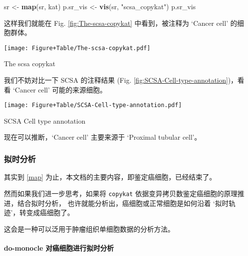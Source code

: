 \documentclass[
]{article}
\newenvironment{Shaded}{\begin{snugshade}}{\end{snugshade}}
\newcommand{\KeywordTok}[1]{\textcolor[rgb]{0.13,0.29,0.53}{\textbf{#1}}}
\newcommand{\NormalTok}[1]{#1}
\newcommand{\StringTok}[1]{\textcolor[rgb]{0.31,0.60,0.02}{#1}}
\begin{document}
\begin{Shaded}
\begin{Highlighting}[]
\NormalTok{sr \textless{}{-}}\StringTok{ }\KeywordTok{map}\NormalTok{(sr, kat)}
\NormalTok{p.sr\_vis \textless{}{-}}\StringTok{ }\KeywordTok{vis}\NormalTok{(sr, }\StringTok{"scsa\_copykat"}\NormalTok{)}
\NormalTok{p.sr\_vis}
\end{Highlighting}
\end{Shaded}

这样我们就能在 Fig. \ref{fig:The-scsa-copykat} 中看到，被注释为 `Cancer cell' 的细胞群体。

\def\@captype{figure}
\begin{center}
\texttt{[image: Figure+Table/The-scsa-copykat.pdf]}
\caption{The scsa copykat}\label{fig:The-scsa-copykat}
\end{center}

我们不妨对比一下 SCSA 的注释结果 (Fig. \ref{fig:SCSA-Cell-type-annotation})，看看 `Cancer cell' 可能的来源细胞。

\def\@captype{figure}
\begin{center}
\texttt{[image: Figure+Table/SCSA-Cell-type-annotation.pdf]}
\caption{SCSA Cell type annotation}\label{fig:SCSA-Cell-type-annotation}
\end{center}

现在可以推断，`Cancer cell' 主要来源于 `Proximal tubular cell'。

\hypertarget{ux62dfux65f6ux5206ux6790}{%
\subsubsection{拟时分析}\label{ux62dfux65f6ux5206ux6790}}

其实到 \ref{map} 为止，本文档的主要内容，即鉴定癌细胞，已经结束了。

然而如果我们进一步思考，如果将 \texttt{copykat} 依据变异拷贝数鉴定癌细胞的原理推进，结合拟时分析，
也许就能分析出，癌细胞或正常细胞是如何沿着 `拟时轨迹'，转变成癌细胞了。

这会是一种可以泛用于肿瘤组织单细胞数据的分析方法。

\hypertarget{do-monocle-ux5bf9ux764cux7ec6ux80deux8fdbux884cux62dfux65f6ux5206ux6790}{%
\paragraph{do-monocle 对癌细胞进行拟时分析}\label{do-monocle-ux5bf9ux764cux7ec6ux80deux8fdbux884cux62dfux65f6ux5206ux6790}}
\end{document}
